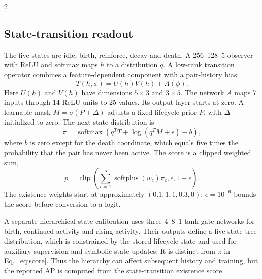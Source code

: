 \documentclass[a4paper,10pt,fleqn]{article}
\begin{document}
\begin{multicols}{2}
\subsection{State-transition readout}
The five states are idle, birth, reinforce, decay and death. A 256--128--5 observer with ReLU and softmax maps $h$ to a distribution $q$. A low-rank transition operator combines a feature-dependent component with a pair-history bias:
\begin{equation}
T(h,\phi)=U(h)V(h)+A(\phi).
\label{eq:operator}
\end{equation}
Here $U(h)$ and $V(h)$ have dimensions $5\times3$ and $3\times5$. The network $A$ maps 7 inputs through 14 ReLU units to 25 values. Its output layer starts at zero. A learnable mask $M=\sigma(P+\Delta)$ adjusts a fixed lifecycle prior $P$, with $\Delta$ initialized to zero. The next-state distribution is
\begin{equation}
\pi=\operatorname{softmax}\!\left(q^TT+\log(q^TM+\epsilon)-b\right),
\label{eq:state}
\end{equation}
where $b$ is zero except for the death coordinate, which equals five times the probability that the pair has never been active. The score is a clipped weighted sum,
\begin{equation}
p=\operatorname{clip}\!\left(\sum_{c=1}^{5}\operatorname{softplus}(w_c)\pi_c,\epsilon,1-\epsilon\right).
\label{eq:score}
\end{equation}
The existence weights start at approximately $(0.1,1,1,0.3,0)$; $\epsilon=10^{-6}$ bounds the score before conversion to a logit.

A separate hierarchical state calibration uses three 4--8--1 tanh gate networks for birth, continued activity and rising activity. Their outputs define a five-state tree distribution, which is constrained by the stored lifecycle state and used for auxiliary supervision and symbolic state updates. It is distinct from $\pi$ in Eq.~\eqref{eq:score}. Thus the hierarchy can affect subsequent history and training, but the reported AP is computed from the state-transition existence score.


\end{multicols}
\end{document}
